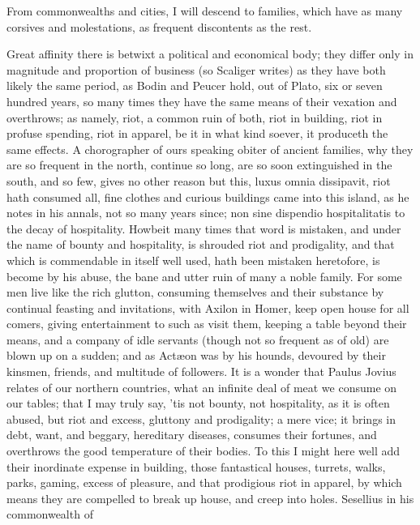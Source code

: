 {From commonwealths and cities, I will descend to families, which have
as many corsives and molestations, as frequent discontents as the rest.

Great affinity there is betwixt a political and economical body; they
differ only in magnitude and proportion of business (so Scaliger
writes) as they have both likely the same period, as Bodin
and Peucer hold, out of Plato, six or seven hundred years, so many
times they have the same means of their vexation and overthrows; as
namely, riot, a common ruin of both, riot in building, riot in profuse
spending, riot in apparel, \etc{} be it in what kind soever, it produceth
the same effects. A chorographer of ours speaking obiter of
ancient families, why they are so frequent in the north, continue so
long, are so soon extinguished in the south, and so few, gives no other
reason but this, luxus omnia dissipavit, riot hath consumed all, fine
clothes and curious buildings came into this island, as he notes in his
annals, not so many years since; non sine dispendio hospitalitatis to
the decay of hospitality. Howbeit many times that word is mistaken, and
under the name of bounty and hospitality, is shrouded riot and
prodigality, and that which is commendable in itself well used, hath
been mistaken heretofore, is become by his abuse, the bane and utter
ruin of many a noble family. For some men live like the rich glutton,
consuming themselves and their substance by continual feasting and
invitations, with Axilon in Homer, keep open house for all comers,
giving entertainment to such as visit them, keeping a table beyond
their means, and a company of idle servants (though not so frequent as
of old) are blown up on a sudden; and as Act\ae{}on was by his hounds,
devoured by their kinsmen, friends, and multitude of followers. It
is a wonder that Paulus Jovius relates of our northern countries, what
an infinite deal of meat we consume on our tables; that I may truly
say, 'tis not bounty, not hospitality, as it is often abused, but riot
and excess, gluttony and prodigality; a mere vice; it brings in debt,
want, and beggary, hereditary diseases, consumes their fortunes, and
overthrows the good temperature of their bodies. To this I might here
well add their inordinate expense in building, those fantastical
houses, turrets, walks, parks, \etc{} gaming, excess of pleasure, and that
prodigious riot in apparel, by which means they are compelled to break
up house, and creep into holes. Sesellius in his commonwealth of
}
